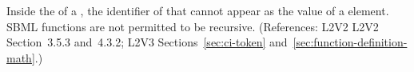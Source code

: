 Inside the  of a \FunctionDefinition, the identifier of that
\FunctionDefinition cannot appear as the value of a  element.
SBML functions are not permitted to be recursive.  (References: L2V2
L2V2 Section~3.5.3 and~4.3.2; L2V3 Sections~\ref{sec:ci-token}
and~\ref{sec:function-definition-math}.)
